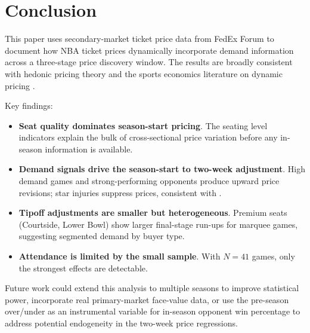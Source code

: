 \documentclass[12pt]{article}
\begin{document}
 
\section{Conclusion}
\label{sec:conclusion}
 
This paper uses secondary-market ticket price data from FedEx Forum to document how NBA ticket prices dynamically incorporate demand information across a three-stage price discovery window. The results are broadly consistent with hedonic pricing theory \citep{rosen1974hedonic} and the sports economics literature on dynamic pricing \citep{drayer2012dynamic, courty2020variable}.
 
Key findings:
\begin{itemize}
    \item \textbf{Seat quality dominates season-start pricing}. The seating level indicators explain the bulk of cross-sectional price variation before any in-season information is available.
    \item \textbf{Demand signals drive the season-start to two-week adjustment}. High demand games and strong-performing opponents produce upward price revisions; star injuries suppress prices, consistent with \citet{kaplan2019economic}.
    \item \textbf{Tipoff adjustments are smaller but heterogeneous}. Premium seats (Courtside, Lower Bowl) show larger final-stage run-ups for marquee games, suggesting segmented demand by buyer type.
    \item \textbf{Attendance is limited by the small sample}. With $N = 41$ games, only the strongest effects are detectable.
\end{itemize}
 
Future work could extend this analysis to multiple seasons to improve statistical power, incorporate real primary-market face-value data, or use the pre-season over/under as an instrumental variable for in-season opponent win percentage to address potential endogeneity in the two-week price regressions.
 
 
\newpage
 
 
\newpage
\appendix
\end{document}
